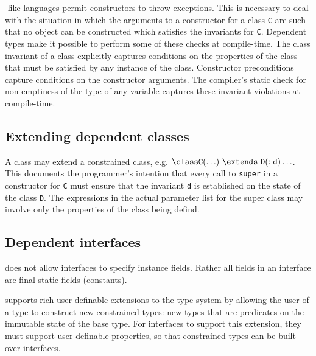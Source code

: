 \java{}-like languages permit constructors to throw exceptions. This
is necessary to deal with the situation in which the arguments to a
constructor for a class {\tt C} are such that no object can be
constructed which satisfies the invariants for {\tt C}. Dependent
types make it possible to perform some of these checks at
compile-time. The class invariant of a class explicitly captures
conditions on the properties of the class that must be satisfied by
any instance of the class.  Constructor preconditions capture
conditions on the constructor arguments.
The compiler's static check for
non-emptiness of the type of any variable captures these invariant
violations at compile-time.




\subsection{Extending dependent classes}

A class may extend a constrained class, e.g.{} ${\tt \class C(\ldots)\ 
\extends\ D(:d)\ldots}$. This documents the programmer's intention that
every call to {\tt super} in a constructor for {\tt C} must ensure
that the invariant {\tt d} is established on the state of the class
{\tt D}. The expressions in the actual parameter list for the super
class may involve only the properties of the class being defind.


\subsection{Dependent interfaces}

\java{} does not allow interfaces to specify instance fields. Rather all
fields in an interface are final static fields (constants).

\Xten{} supports rich user-definable extensions to the type system by
allowing the user of a type to construct new constrained types: new
types that are predicates on the immutable state of the base type.
For interfaces to support this extension, they must support
user-definable properties, so that constrained types can be
built over interfaces.

